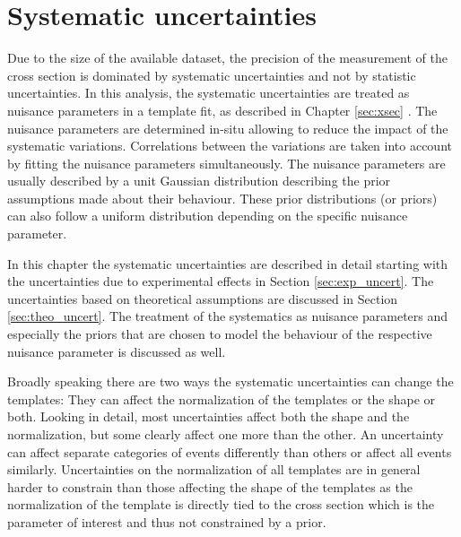 
\chapter{Systematic uncertainties}
\label{sec:syst_uncert}

Due to the size of the available dataset, the precision of the measurement of the \ttbar cross section is dominated by systematic uncertainties and not by statistic uncertainties.
In this analysis, the systematic uncertainties are treated as nuisance parameters in a
template fit, as described in Chapter \ref{sec:xsec} . The nuisance parameters are determined in-situ allowing to reduce the impact of the systematic variations. 
Correlations between the variations are taken into account by fitting the nuisance parameters simultaneously.
The nuisance parameters are usually described by a unit Gaussian distribution describing the prior assumptions made about their behaviour.
These prior distributions (or priors) can also follow a uniform distribution depending on the specific nuisance parameter.

In this chapter the systematic uncertainties are described in detail starting with the uncertainties due to experimental effects in Section \ref{sec:exp_uncert}.
The uncertainties based on theoretical assumptions are discussed in Section \ref{sec:theo_uncert}. The treatment of the systematics as nuisance
parameters and especially the priors that are chosen to model the behaviour of the respective nuisance parameter is discussed as well.

Broadly speaking there are two ways the systematic uncertainties can change the templates: They can affect the normalization of the templates or the shape or both.
Looking in detail, most uncertainties affect both the shape and the normalization, but some clearly affect one more than the other.
An uncertainty can affect separate categories of events differently than others or affect all events similarly.
Uncertainties on the normalization of all templates are in general harder to constrain than those affecting the shape of the templates as the normalization of the
\ttbar template is directly tied to the cross section which is the parameter of interest and thus not constrained by a prior. 


